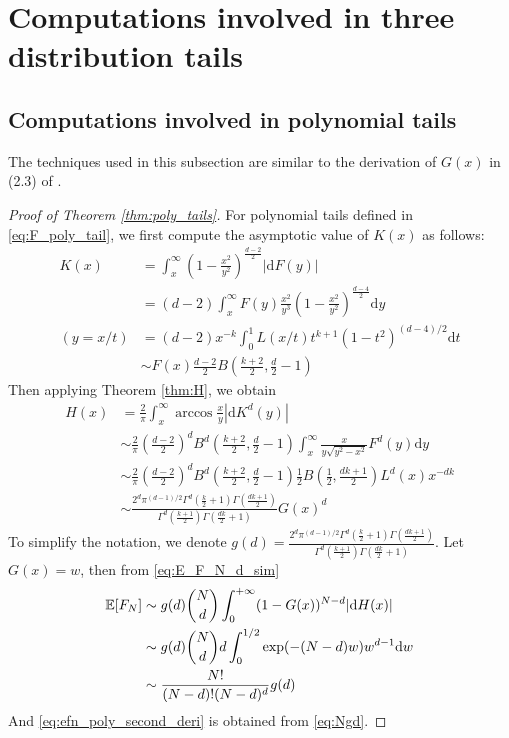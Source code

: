 \documentclass[conference,a4paper]{IEEEtran}
\def\E{\mathbb{E}}
\def\d{\mathrm{d}}
\begin{document}
\section{Computations involved in three distribution tails}
\subsection{Computations involved in polynomial tails}
The techniques used in this subsection are similar to the derivation of $G(x)$
in (2.3) of \cite{carnal1970konvexe}.

\begin{proof}[Proof of Theorem \ref{thm:poly_tails}]
For polynomial tails defined in \eqref{eq:F_poly_tail},
we first compute the asymptotic value of $K(x)$
as follows:
\begin{align*}
     K(x) & = \int_x^{\infty} (1-\frac{x^2}{y^2})^{\frac{d-2}{2}} |\d F(y)| \\
     &= (d-2)\int_x^{\infty} F(y)\frac{x^2}{y^3} (1-\frac{x^2}{y^2})^{\frac{d-4}{2}} \d y\\
     (y=x/t) &= (d-2)x^{-k} \int_0^{1} L(x/t) t^{k+1} (1-t^2)^{(d-4)/2}\d t \\
     & \sim F(x) \frac{d-2}{2} B\left(\frac{k+2}{2}, \frac{d}{2}-1\right) 
\end{align*}
Then applying Theorem \ref{thm:H}, we obtain
\begin{align*}
     H(x) &= \frac{2}{\pi}
     \int_x^{\infty} \arccos\frac{x}{y}
     |\d K^d(y)| \\
     &\sim \frac{2}{\pi}\left(\frac{d-2}{2}\right)^d
     B^d\left(\frac{k+2}{2}, \frac{d}{2}-1\right)
     \int_x^{\infty} \frac{x}{y \sqrt{y^2-x^2}} F^d(y) \d y \\
     &\sim \frac{2}{\pi}\left(\frac{d-2}{2}\right)^d
     B^d\left(\frac{k+2}{2}, \frac{d}{2}-1\right) \frac{1}{2}
     B\left(\frac{1}{2}, \frac{dk+1}{2}\right)L^d(x) x^{-dk} \\
     &\sim \frac{2^d \pi^{(d-1)/2}\Gamma^d(\frac{k}{2}+1)
     \Gamma(\frac{dk+1}{2})}{
         \Gamma^d(\frac{k+1}{2}) \Gamma(\frac{dk}{2}+1)} G(x)^d 
\end{align*}
To simplify the notation, we denote $g(d)=\frac{2^d \pi^{(d-1)/2}\Gamma^d(\frac{k}{2}+1)
\Gamma(\frac{dk+1}{2})}{
    \Gamma^d(\frac{k+1}{2}) \Gamma(\frac{dk}{2}+1)}$.
Let $G(x)=w$, then from \eqref{eq:E_F_N_d_sim}
\begin{align}
     \E[F_N] &\sim g(d)\binom{N}{d} \int_0^{+\infty} 
      (1-G(x))^{N-d} |\d H(x)| \notag \\
      &\sim g(d)\binom{N}{d}d\int_0^{1/2} \exp(-(N-d)w)w^{d-1}\d w
      \notag \\
      &\sim \frac{N!}{(N-d)! (N-d)^d}g(d) \label{eq:Ngd}
\end{align}
And \eqref{eq:efn_poly_second_deri} is obtained from \eqref{eq:Ngd}.
\end{proof}
\end{document}

